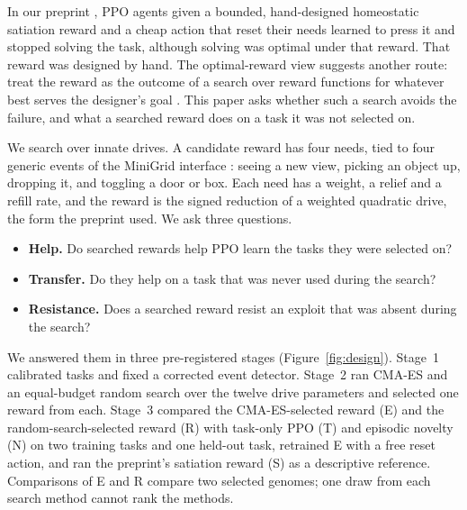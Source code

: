 \documentclass[11pt,letterpaper]{article}
\begin{document}
In our preprint \citep{metoyer2026satisfied}, PPO agents given a bounded, hand-designed homeostatic satiation reward
and a cheap action that reset their needs learned to press it and stopped solving the task, although solving was
optimal under that reward. That reward was designed by hand. The optimal-reward view suggests another route:
treat the reward as the outcome of a search over reward functions for whatever best serves the designer's goal
\citep{singh2010intrinsically}. This paper asks whether such a search avoids the failure, and what a searched reward
does on a task it was not selected on.

We search over innate drives. A candidate reward has four needs, tied to four generic events of the MiniGrid
interface \citep{chevalier2023minigrid}: seeing a new view, picking an object up, dropping it, and toggling a door or
box. Each need has a weight, a relief and a refill rate, and the reward is the signed reduction of a weighted
quadratic drive, the form the preprint used. We ask three questions.
\begin{itemize}[itemsep=1pt]
  \item \textbf{Help.} Do searched rewards help PPO \citep{schulman2017proximal} learn the tasks they were selected on?
  \item \textbf{Transfer.} Do they help on a task that was never used during the search?
  \item \textbf{Resistance.} Does a searched reward resist an exploit that was absent during the search?
\end{itemize}

We answered them in three pre-registered stages (Figure~\ref{fig:design}). Stage~1 calibrated tasks and fixed a
corrected event detector. Stage~2 ran CMA-ES \citep{hansen2001completely} and an equal-budget random search over the
twelve drive parameters and selected one reward from each. Stage~3 compared the CMA-ES-selected reward (E) and the
random-search-selected reward (R) with task-only PPO (T) and episodic novelty (N) on two training tasks and one
held-out task, retrained E with a free reset action, and ran the preprint's satiation reward (S) as a descriptive
reference. Comparisons of E and R compare two selected genomes; one draw from each search method cannot rank the
methods.
\end{document}
